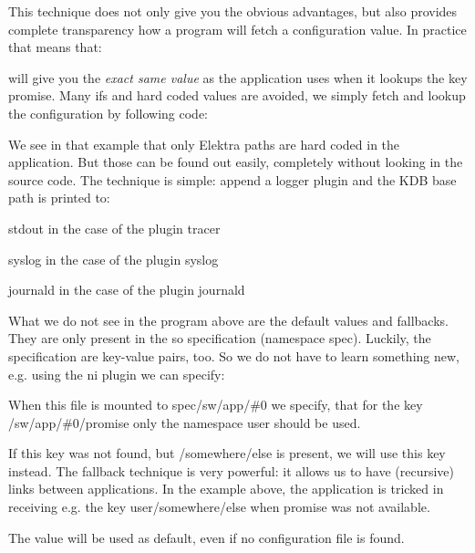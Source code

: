 This technique does not only give you the obvious advantages, but also provides complete transparency how a program will fetch a configuration value. In practice that means that\+: 


will give you the {\itshape exact same value} as the application uses when it lookups the key {\ttfamily promise}. Many {\ttfamily if}s and hard coded values are avoided, we simply fetch and lookup the configuration by following code\+: 


We see in that example that only Elektra paths are hard coded in the application. But those can be found out easily, completely without looking in the source code. The technique is simple\+: append a logger plugin and the K\+DB base path is printed to\+:


\begin{DoxyItemize}
\item stdout in the case of the plugin tracer
\item syslog in the case of the plugin syslog
\item journald in the case of the plugin journald
\end{DoxyItemize}

What we do not see in the program above are the default values and fallbacks. They are only present in the so specification (namespace {\ttfamily spec}). Luckily, the specification are key-\/value pairs, too. So we do not have to learn something new, e.\+g. using the ni plugin we can specify\+: 



\begin{DoxyEnumerate}
\item When this file is mounted to {\ttfamily spec/sw/app/\#0} we specify, that for the key {\ttfamily /sw/app/\#0/promise} only the namespace {\ttfamily user} should be used.
\item If this key was not found, but {\ttfamily /somewhere/else} is present, we will use this key instead. The {\ttfamily fallback} technique is very powerful\+: it allows us to have (recursive) links between applications. In the example above, the application is tricked in receiving e.\+g. the key {\ttfamily user/somewhere/else} when {\ttfamily promise} was not available.
\item The value {} will be used as default, even if no configuration file is found.
\end{DoxyEnumerate}


